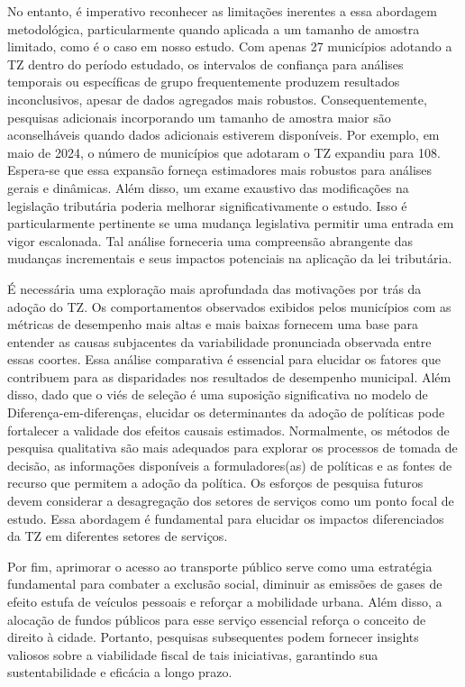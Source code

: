 \documentclass[12pt, a4paper, twoside]{article}
\numberwithin{equation}{subsection} %
\begin{document}
No entanto, é imperativo reconhecer as limitações inerentes a essa
abordagem metodológica, particularmente quando aplicada a um tamanho de
amostra limitado, como é o caso em nosso estudo. Com apenas 27
municípios adotando a TZ dentro do período estudado, os intervalos de
confiança para análises temporais ou específicas de grupo frequentemente
produzem resultados inconclusivos, apesar de dados agregados mais
robustos. Consequentemente, pesquisas adicionais incorporando um tamanho
de amostra maior são aconselháveis \hspace{0pt}\hspace{0pt}quando dados
adicionais estiverem disponíveis. Por exemplo, em maio de 2024, o número
de municípios que adotaram o TZ expandiu para 108. Espera-se que essa
expansão forneça estimadores mais robustos para análises gerais e
dinâmicas. Além disso, um exame exaustivo das modificações na legislação
tributária poderia melhorar significativamente o estudo. Isso é
particularmente pertinente se uma mudança legislativa permitir uma
entrada em vigor escalonada. Tal análise forneceria uma compreensão
abrangente das mudanças incrementais e seus impactos potenciais na
aplicação da lei tributária.

É necessária uma exploração mais aprofundada das motivações por trás da
adoção do TZ. Os comportamentos observados exibidos pelos municípios com
as métricas de desempenho mais altas e mais baixas fornecem uma base
para entender as causas subjacentes da variabilidade pronunciada
observada entre essas coortes. Essa análise comparativa é essencial para
elucidar os fatores que contribuem para as disparidades nos resultados
de desempenho municipal. Além disso, dado que o viés de seleção é uma
suposição significativa no modelo de Diferença-em-diferenças, elucidar
os determinantes da adoção de políticas pode fortalecer a validade dos
efeitos causais estimados. Normalmente, os métodos de pesquisa
qualitativa são mais adequados para explorar os processos de tomada de
decisão, as informações disponíveis a formuladores(as) de políticas e as
fontes de recurso que permitem a adoção da política. Os esforços de
pesquisa futuros devem considerar a desagregação dos setores de serviços
como um ponto focal de estudo. Essa abordagem é fundamental para
elucidar os impactos diferenciados da TZ em diferentes setores de
serviços.

Por fim, aprimorar o acesso ao transporte público serve como uma
estratégia fundamental para combater a exclusão social, diminuir as
emissões de gases de efeito estufa de veículos pessoais e reforçar a
mobilidade urbana. Além disso, a alocação de fundos públicos para esse
serviço essencial reforça o conceito de direito à cidade. Portanto,
pesquisas subsequentes podem fornecer insights valiosos sobre a
viabilidade fiscal de tais iniciativas, garantindo sua sustentabilidade
e eficácia a longo prazo.
\end{document}

